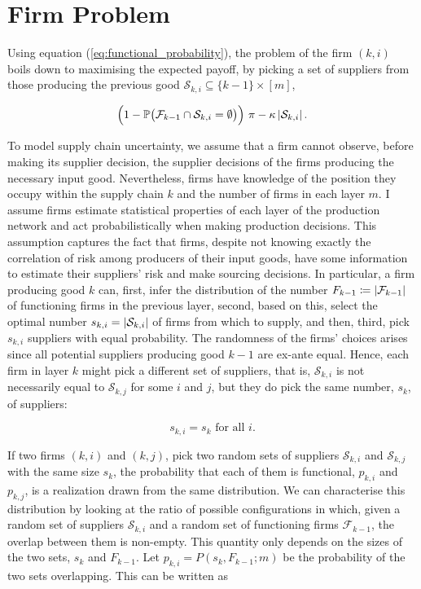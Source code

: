 \documentclass[../../main.tex]{subfiles}
\begin{document}
\section{Firm Problem}

Using equation (\ref{eq:functional_probability}), the problem of the firm $(k, i)$ boils down to maximising the expected payoff, by picking a set of suppliers from those producing the previous good $\mathcal{S}_{k, i} \subseteq \{k - 1\} \times [m]$, 

\begin{equation}
  \Big(1 - \mathbb{P}\big( \mathcal{F}_{k - 1} \cap \mathcal{S}_{k, i} = \emptyset \big) \Big) \ \pi  - \kappa \left\lvert\mathcal{S}_{k, i} \right\rvert.
\end{equation}


To model supply chain uncertainty, we assume that a firm cannot observe, before making its supplier decision, the supplier decisions of the firms producing the necessary input good. Nevertheless, firms have knowledge of the position they occupy within the supply chain $k$ and the number of firms in each layer $m$. I assume firms estimate statistical properties of each layer of the production network and act probabilistically when making production decisions. This assumption captures the fact that firms, despite not knowing exactly the correlation of risk among producers of their input goods, have some information to estimate their suppliers' risk and make sourcing decisions. In particular, a firm producing good $k$ can, first, infer the distribution of the number $F_{k - 1} \coloneqq \left\lvert\mathcal{F}_{k - 1}\right\rvert$ of functioning firms in the previous layer, second, based on this, select the optimal number $s_{k, i} = \left\lvert\mathcal{S}_{k, i}\right\rvert$ of firms from which to supply, and then, third, pick $s_{k, i}$ suppliers with equal probability. The randomness of the firms' choices arises since all potential suppliers producing good $k - 1$ are ex-ante equal. Hence, each firm in layer $k$ might pick a different set of suppliers, that is, $\mathcal{S}_{k, i}$ is not necessarily equal to $\mathcal{S}_{k, j}$ for some $i$ and $j$, but they do pick the same number, $s_k$, of suppliers:

\begin{equation}
  s_{k, i} = s_k \text{ for all } i.
\end{equation}

If two firms $(k, i)$ and $(k, j)$, pick two random sets of suppliers $\mathcal{S}_{k, i}$ and $\mathcal{S}_{k, j}$ with the same size $s_k$, the probability that each of them is functional, $p_{k, i}$ and $p_{k, j}$, is a realization drawn from the same distribution. We can characterise this distribution by looking at the ratio of possible configurations in which, given a random set of suppliers $\mathcal{S}_{k, i}$ and a random set of functioning firms $\mathcal{F}_{k - 1}$, the overlap between them is non-empty. This quantity only depends on the sizes of the two sets, $s_k$ and $F_{k - 1}$. Let $p_{k, i} = P(s_k, F_{k - 1}; m)$ be the probability of the two sets overlapping. This can be written as 
\end{document}

